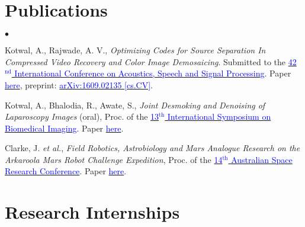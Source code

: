 \documentclass[margin,line]{res}
\newenvironment{list2}{
  \begin{list}{$\bullet$}{%
      \setlength{\itemsep}{0in}
      \setlength{\parsep}{0in} \setlength{\parskip}{0in}
      \setlength{\topsep}{0in} \setlength{\partopsep}{0in} 
      \setlength{\leftmargin}{0.18in}}}{\end{list}}
\begin{document}
\begin{resume}
\vspace*{-0.13in}

\section{\sc Publications}
\begin{list2}
\item Kotwal, A., Rajwade, A. V., {\em Optimizing Codes for Source Separation In Compressed Video Recovery and Color Image Demosaicing}. Submitted to the \href{http://www.ieee-icassp2017.org/}{\textcolor{blue} {42$^\text{nd}$ International Conference on Acoustics, Speech and Signal Processing}}. Paper \href{http://alankarkotwal.github.io/pubs/icassp17.pdf}{\textcolor{blue} {here}}, preprint: \href{https://arxiv.org/abs/1609.02135}{\textcolor{blue} {arXiv:1609.02135 [cs.CV]}}.
\item Kotwal, A., Bhalodia, R., Awate, S., {\em Joint Desmoking and Denoising of Laparoscopy Images} (oral), Proc. of the \href{http://biomedicalimaging.org/2016/}{\textcolor{blue} {13$^\text{th}$ International Symposium on Biomedical Imaging}}. Paper \href{http://alankarkotwal.github.io/pubs/isbi16.pdf}{\textcolor{blue} {here}}.
\item Clarke, J. {\em et al.}, {\em Field Robotics, Astrobiology and Mars Analogue Research on the Arkaroola Mars Robot Challenge Expedition}, Proc. of the \href{http://www.nssa.com.au/14asrc/14ASRC-proceedings.zip}{\textcolor{blue} {14$^\text{th}$ Australian Space Research Conference}}. Paper \href{http://alankarkotwal.github.io/pubs/asrc14.pdf}{\textcolor{blue} {here}}.
\end{list2}

\vspace*{-0.13in}

\section{\sc Research Internships} 


\end{resume}
\end{document}
